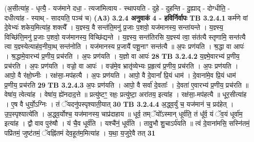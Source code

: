 \documentclass[17pt]{extarticle}
\begin{document}
{{{{{{{{{{{{{{{{{{{                  \newline
                                    (अ॒सीत्या॑ह॒ - धृत्यै॒ - यज॑माने दधा॒ - त्यजा॑मित्वाय - स्थापयति - दुहे - दुहन्ति - दु॒ह्याद् - दोग्धीति॒ - दधीत्या॑ह - स्याथ् - सादयति॒ पञ्च॑ च) \textbf{(A3)} \newline \newline
                \textbf{ 3.2.4     अनुवाकं   4 - हविर्निर्वापः} \newline
                                \textbf{ TB 3.2.4.1} \newline
                  कर्म॑णे वां दे॒वेभ्यः॑ शकेय॒मित्या॑ह॒ शक्त्यै᳚ । य॒ज्ञ्स्य॒ वै सन्त॑ति॒मनु॑ प्र॒जाः प॒शवो॒ यज॑मानस्य॒ सन्ता॑यन्ते । य॒ज्ञ्स्य॒ विच्छि॑त्ति॒मनु॑ प्र॒जाः प॒शवो॒ यज॑मानस्य॒ विच्छि॑द्यन्ते । य॒ज्ञ्स्य॒ सन्त॑तिरसि य॒ज्ञ्स्य॑ त्वा॒ संत॑त्यै स्तृणामि॒ सन्त॑त्यै त्वा य॒ज्ञ्स्येत्याह॑व॒नीया॒थ् सन्त॑नोति । यज॑मानस्य प्र॒जायै॑ पशू॒नाꣳ सन्त॑त्यै ॥ अ॒पः प्रण॑यति । श्र॒द्धा वा आपः॑ । श्र॒द्धामे॒वारभ्य॑ प्र॒णीय॒ प्रच॑रति । अ॒पः प्रण॑यति । य॒ज्ञो वा आपः॑ \textbf{ 28} \newline
                  \newline
                                \textbf{ TB 3.2.4.2} \newline
                  य॒ज्ञ्मे॒वारभ्य॑ प्र॒णीय॒ प्रच॑रति । अ॒पः प्रण॑यति । वज्रो॒ वा आपः॑ । वज्र॑मे॒व भ्रातृ॑व्येभ्यः प्र॒हृत्य॑ प्र॒णीय॒ प्रच॑रति । अ॒पः प्रण॑यति । आपो॒ वै र॑क्षो॒घ्नीः । रक्ष॑सा॒-मप॑हत्यै । अ॒पः प्रण॑यति । आपो॒ वै दे॒वानां᳚ प्रि॒यं धाम॑ । दे॒वाना॑मे॒व प्रि॒यं धाम॑ प्र॒णीय॒ प्रच॑रति \textbf{ 29} \newline
                  \newline
                                \textbf{ TB 3.2.4.3} \newline
                  अ॒पः प्रण॑यति । आपो॒ वै सर्वा॑ दे॒वताः᳚ । दे॒वता॑ ए॒वारभ्य॑ प्र॒णीय॒ प्रच॑रति ॥ वेषा॑य॒ त्वेत्या॑ह । वेषा॑य॒ ह्ये॑नदाद॒त्ते ॥ प्रत्यु॑ष्टꣳ॒॒ रक्षः॒ प्रत्यु॑ष्टा॒ अरा॑तय॒ इत्या॑ह । रक्ष॑सा॒-मप॑हत्यै ॥ धूर॒सीत्या॑ह । ए॒ष वै धुर्यो॒ऽग्निः । तं ॅयदनु॑पस्पृश्याती॒यात् \textbf{ 30} \newline
                  \newline
                                \textbf{ TB 3.2.4.4} \newline
                  अ॒द्ध्व॒र्युं च॒ यज॑मानं च॒ प्रद॑हेत् । उ॒प॒स्पृश्यात्ये॑ति । अ॒द्ध्व॒र्योश्च॒ यज॑मानस्य॒ चाप्र॑दाहाय ॥ धूर्व॒ तम्ॅयो᳚ऽस्मान् धूर्व॑ति॒ तं धू᳚र्व॒ यं ॅव॒यं धूर्वा॑म॒ इत्या॑ह । द्वौ वाव पुरु॑षौ । यं चै॒व धूर्व॑ति । यश्चै॑नं॒ धूर्व॑ति । तावु॒भौ शु॒चाऽर्प॑यति ॥ त्वं दे॒वाना॑मसि॒ सस्नि॑तमं॒ पप्रि॑तमं॒ जुष्ट॑तमं॒ ॅवह्नि॑तमं देव॒हूत॑म॒मित्या॑ह । य॒था॒ य॒जुरे॒वै तत् \textbf{ 31} \newline
}}}}}}}}}}}}}}}}}}}
\end{document}
